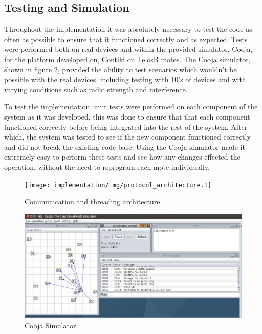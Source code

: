 \subsection{Testing and Simulation} %
\label{sub:testing_and_simulation}
Throughout the implementation it was absolutely necessary to test the code as often as possible to ensure that it functioned correctly and as expected. Tests were performed both on real devices and within the provided simulator, Cooja, for the platform developed on, Contiki on TelosB motes. The Cooja simulator, shown in figure \ref{fig:simulator}, provided the ability to test scenarios which wouldn't be possible with the real devices, including testing with 10's of devices and with varying conditions such as radio strength and interference.

To test the implementation, unit tests were performed on each component of the system as it was developed, this was done to ensure that that each component functioned correctly before being integrated into the rest of the system. After which, the system was tested to see if the new component functioned correctly and did not break the existing code base. Using the Cooja simulator made it extremely easy to perform these tests and see how any changes effected the operation, without the need to reprogram each mote individually. 


\begin{figure}[h!]
\centering
\texttt{[image: implementation/img/protocol\_architecture.1]}
\caption{Communication and threading architecture}
\label{fig:protocol_architecture}
\end{figure}

\begin{figure}[h!]
\centering
\includegraphics[scale=0.5]{implementation/img/cooja.jpg}
\caption{Cooja Simulator}
\label{fig:simulator}
\end{figure}



